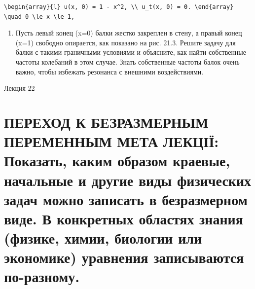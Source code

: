 \documentclass[
  ukrainian,
]{article}
\providecommand{\tightlist}{%
  \setlength{\itemsep}{0pt}\setlength{\parskip}{0pt}}
\begin{document}
\begin{verbatim}
\begin{array}{l} u(x, 0) = 1 - x^2, \\ u_t(x, 0) = 0. \end{array}
\quad 0 \le x \le 1,
\end{verbatim}

\begin{enumerate}
\def\labelenumi{\arabic{enumi}.}
\setcounter{enumi}{3}
\tightlist
\item
  Пусть левый конец (x=0) балки жестко закреплен в стену, а правый конец
  (x=1) свободно опирается, как показано на рис. 21.3. Решите задачу для
  балки с такими граничными условиями и объясните, как найти собственные
  частоты колебаний в этом случае. Знать собственные частоты балок очень
  важно, чтобы избежать резонанса с внешними воздействиями.
\end{enumerate}

Лекция 22

\section{ПЕРЕХОД К БЕЗРАЗМЕРНЫМ ПЕРЕМЕННЫМ МЕТА ЛЕКЦІЇ: Показать, каким
образом краевые, начальные и другие виды физических задач можно записать
в безразмерном виде. В конкретных областях знания (физике, химии,
биологии или экономике) уравнения записываются
по-разному.}\label{ux43fux435ux440ux435ux445ux43eux434-ux43a-ux431ux435ux437ux440ux430ux437ux43cux435ux440ux43dux44bux43c-ux43fux435ux440ux435ux43cux435ux43dux43dux44bux43c-ux43cux435ux442ux430-ux43bux435ux43aux446ux456ux457-ux43fux43eux43aux430ux437ux430ux442ux44c-ux43aux430ux43aux438ux43c-ux43eux431ux440ux430ux437ux43eux43c-ux43aux440ux430ux435ux432ux44bux435-ux43dux430ux447ux430ux43bux44cux43dux44bux435-ux438-ux434ux440ux443ux433ux438ux435-ux432ux438ux434ux44b-ux444ux438ux437ux438ux447ux435ux441ux43aux438ux445-ux437ux430ux434ux430ux447-ux43cux43eux436ux43dux43e-ux437ux430ux43fux438ux441ux430ux442ux44c-ux432-ux431ux435ux437ux440ux430ux437ux43cux435ux440ux43dux43eux43c-ux432ux438ux434ux435.-ux432-ux43aux43eux43dux43aux440ux435ux442ux43dux44bux445-ux43eux431ux43bux430ux441ux442ux44fux445-ux437ux43dux430ux43dux438ux44f-ux444ux438ux437ux438ux43aux435-ux445ux438ux43cux438ux438-ux431ux438ux43eux43bux43eux433ux438ux438-ux438ux43bux438-ux44dux43aux43eux43dux43eux43cux438ux43aux435-ux443ux440ux430ux432ux43dux435ux43dux438ux44f-ux437ux430ux43fux438ux441ux44bux432ux430ux44eux442ux441ux44f-ux43fux43e-ux440ux430ux437ux43dux43eux43cux443.}
\end{document}
